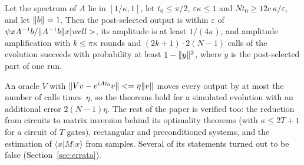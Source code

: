 \begin{theorem}\label{thm:runtime}
Let the spectrum of $A$ lie in $[1/\kappa,1]$, let $t_0\le\pi/2$, $\varepsilon\kappa\le1$ and
$Nt_0\ge12c\,\kappa/\varepsilon$, and let $\|b\|=1$. Then the post-selected output is within
$\varepsilon$ of $\psi x A^{-1}b/\|A^{-1}b\|x|\mathit{well}>$, its amplitude is at least
$1/(4\kappa)$, and amplitude amplification with $k\le\pi\kappa$ rounds and $(2k+1)\cdot2(N-1)$ calls of the
evolution succeeds with probability at least $1-\|y\|^2$, where $y$ is the post-selected part of
one run.
\end{theorem}

\noindent An oracle $V$ with $\|Vv-e^{iAt_0}v\|<=\eta\|v\|$ moves every output by at most the number
of calls times~$\eta$, so the theorems hold for a simulated evolution with an additional error
$2(N-1)\eta$. The rest of the paper is verified too: the reduction from circuits to matrix inversion
behind its optimality theorems (with $\kappa\le2T+1$ for a circuit of $T$ gates), rectangular and
preconditioned systems, and the estimation of $\langle x|M|x\rangle$ from samples. Several of its
statements turned out to be false (Section~\ref{sec:errata}).
